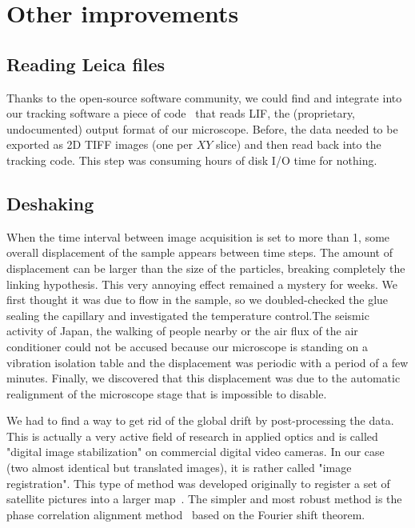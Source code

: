 \section{Other improvements}

\subsection{Reading Leica files}

Thanks to the open-source software community, we could find and integrate into our tracking software a piece of code~\citep{kankaanpaa2006bioimagexd} that reads \ac{LIF}, the (proprietary, undocumented) output format of our microscope. Before, the data needed to be exported as 2D TIFF images (one per $XY$ slice) and then read back into the tracking code. This step was consuming hours of disk I/O time for nothing.

\subsection{Deshaking}

When the time interval between image acquisition is set to more than \unit{1}{\minute}, some overall displacement of the sample appears between time steps. The amount of displacement can be larger than the size of the particles, breaking completely the linking hypothesis. This very annoying effect remained a mystery for weeks. We first thought it was due to flow in the sample, so we doubled-checked the glue sealing the capillary and investigated the temperature control.The seismic activity of Japan, the walking of people nearby or the air flux of the air conditioner could not be accused because our microscope is standing on a vibration isolation table and the displacement was periodic with a period of a few minutes. Finally, we discovered that this displacement was due to the automatic realignment of the microscope stage that is impossible to disable.

We had to find a way to get rid of the global drift by post-processing the data. This is actually a very active field of research in applied optics and is called "digital image stabilization" on commercial digital video cameras. In our case (two almost identical but translated images), it is rather called "image registration". This type of method was developed originally to register a set of satellite pictures into a larger map~\citep{Brown1992}. The simpler and most robust method is the phase correlation alignment method~\citep{kuglin1975phase} based on the Fourier shift theorem. 

